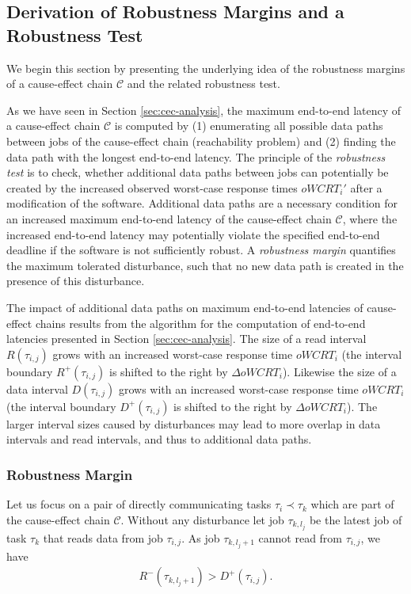 \subsection{Derivation of Robustness Margins and a Robustness Test}
We begin this section by presenting the underlying idea of the robustness margins of a cause-effect chain $\mathcal{C}$ and the related robustness test.
\smallskip

As we have seen in Section \ref{sec:cec-analysis}, the maximum end-to-end latency of a cause-effect chain $\mathcal{C}$ is computed by (1) enumerating all possible data paths between jobs of the cause-effect chain (reachability problem) and (2) finding the data path with the longest end-to-end latency.
The principle of the \emph{robustness test} is to check, whether additional data paths between jobs can potentially be created by the increased observed worst-case response times $oWCRT_i'$ after a modification of the software.
Additional data paths are a necessary condition for an increased maximum end-to-end latency of the cause-effect chain $\mathcal{C}$, where the increased end-to-end latency may potentially violate the specified end-to-end deadline if the software is not sufficiently robust. 
A \emph{robustness margin} quantifies the maximum tolerated disturbance, such that no new data path is created in the presence of this disturbance.
\smallskip

The impact of additional data paths on maximum end-to-end latencies of cause-effect chains results from the algorithm for the computation of end-to-end latencies presented in Section \ref{sec:cec-analysis}. 
The size of a read interval $R(\tau_{i,j})$ grows with an increased worst-case response time $oWCRT_i$ (the interval boundary $R^+(\tau_{i,j})$ is shifted to the right by $\Delta oWCRT_i$).
Likewise the size of a data interval $D(\tau_{i,j})$ grows with an increased worst-case response time $oWCRT_i$ (the interval boundary $D^+(\tau_{i,j})$ is shifted to the right by $\Delta oWCRT_i$). 
The larger interval sizes caused by disturbances may lead to more overlap in data intervals and read intervals, and thus to additional data paths.
\smallskip


\subsubsection{Robustness Margin}
Let us focus on a pair of directly communicating tasks $\tau_i \prec \tau_k$ which are part of the  cause-effect chain $\mathcal{C}$.
Without any disturbance let job $\tau_{k,l_j}$ be the latest job of task $\tau_k$ that reads data from job $\tau_{i,j}$.  
As job $\tau_{k,l_j+1}$ cannot read from $\tau_{i,j}$, we have
\begin{align}
	R^-(\tau_{k,l_j+1}) > D^+(\tau_{i,j}). 
\end{align}


